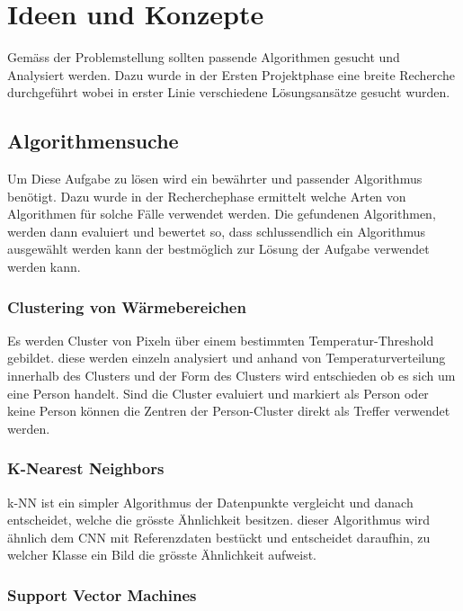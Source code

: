 \chapter{Ideen und Konzepte}

Gemäss der Problemstellung sollten passende Algorithmen gesucht und Analysiert werden. Dazu wurde in der Ersten Projektphase eine breite Recherche durchgeführt wobei in erster Linie verschiedene Lösungsansätze gesucht wurden.

\section{Algorithmensuche}

Um Diese Aufgabe zu lösen wird ein bewährter und passender Algorithmus benötigt. Dazu wurde in der Recherchephase ermittelt welche Arten von Algorithmen für solche Fälle verwendet werden. Die gefundenen Algorithmen, werden dann evaluiert und bewertet so, dass schlussendlich ein Algorithmus ausgewählt werden kann der bestmöglich zur Lösung der Aufgabe verwendet werden kann.

\subsection{Clustering von Wärmebereichen}

Es werden Cluster von Pixeln über einem bestimmten Temperatur-Threshold gebildet. diese werden einzeln analysiert und anhand von Temperaturverteilung innerhalb des Clusters und der Form des Clusters wird entschieden ob es sich um eine Person handelt. Sind die Cluster evaluiert und markiert als Person oder keine Person können die Zentren der Person-Cluster direkt als Treffer verwendet werden.


\subsection{K-Nearest Neighbors}

\gls{k-NN} ist ein simpler Algorithmus der Datenpunkte vergleicht und danach entscheidet, welche die grösste Ähnlichkeit besitzen. dieser Algorithmus wird ähnlich dem \gls{CNN} mit Referenzdaten bestückt und entscheidet daraufhin, zu welcher Klasse ein Bild die grösste Ähnlichkeit aufweist.

\subsection{Support Vector Machines}

